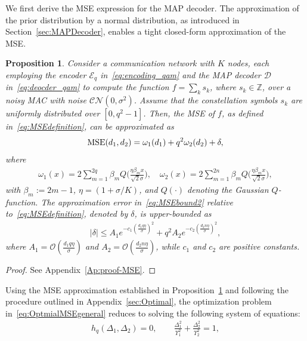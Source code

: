\documentclass[journal,12pt,onecolumn,draftclsnofoot]{IEEEtran}
\newtheorem{prop}{Proposition}
\theoremstyle{definition}
\begin{document}
We first derive the MSE expression for the MAP decoder. The approximation of the prior distribution by a normal distribution, as introduced in Section~\ref{sec:MAPDecoder}, enables a tight closed-form approximation of the MSE. 
\begin{prop}
    \label{Pr:MSE}
    Consider a communication network with $K$ nodes, each employing the encoder $\mathscr{E}_q$ in~\eqref{eq:encoding_qam} and the MAP decoder $\mathscr{D}$ in~\eqref{eq:deocder_qam} to compute the function $f = \sum_{k}s_k$, where $s_k \in \mathbb{Z}$, over a noisy MAC with noise $\mathcal{CN}(0,\sigma^2)$. 
    Assume that the constellation symbols $s_k$ are uniformly distributed over $[0, q^2 - 1]$. 
    Then, the MSE of $f$, as defined in~\eqref{eq:MSEdefinition}, can be approximated as
    \begin{align}
     \label{eq:MSEbound2}
        {\rm MSE}(d_1,d_2)  = \omega_1(d_1) + q^2\omega_2(d_2) +\delta,
    \end{align}
    where 
    \begin{align}
        \nonumber
         \omega_{1}(x) =  2   \sum_{m=1}^{2q}\beta_{m} Q\Big(\frac{\eta \beta_{m}x}{\sqrt{2}\sigma}\Big), \quad \omega_{2}(x) =  2   \sum_{m=1}^{2n}\beta_{m} Q\Big(\frac{\eta \beta_{m}x}{\sqrt{2}\sigma}\Big), 
    \end{align}
    with $\beta_m := 2m - 1$, $\eta = (1 + \sigma/K)$, and $Q(\cdot)$ denoting the Gaussian $Q$-function. The approximation error in~\eqref{eq:MSEbound2} relative to~\eqref{eq:MSEdefinition}, denoted by $\delta$, is upper-bounded as
    \begin{align*}
        |\delta| \leq A_1 e^{-c_1 \left(\frac{d_1 q \eta}{\sigma}\right)^2} 
        + q^2 A_2 e^{-c_2 \left(\frac{d_2 n \eta}{\sigma}\right)^2},
    \end{align*}
    where $A_1 = \mathcal{O}\left(\frac{d_1 q \eta}{\sigma}\right)$ and 
    $A_2 = \mathcal{O}\left(\frac{d_2 n \eta}{\sigma}\right)$, while $c_1$ and $c_2$ are positive constants.
\end{prop}
\begin{proof}
    See Appendix~\ref{Ap:proof-MSE}.
\end{proof}
Using the MSE approximation established in Proposition~\ref{Pr:MSE} and following the procedure outlined in Appendix~\ref{sec:Optimal}, the optimization problem in~\eqref{eq:OptmialMSEgeneral} reduces to solving the following system of equations:
\begin{align}
    \label{eq:optimal_nonlinear_MAp}
     h_q(\Delta_1, \Delta_2) = 0, 
     \qquad 
     \frac{\Delta_1^2}{\Upsilon_1^2} + \frac{\Delta_2^2}{\Upsilon_2^2} = 1,
\end{align}
\end{document}
